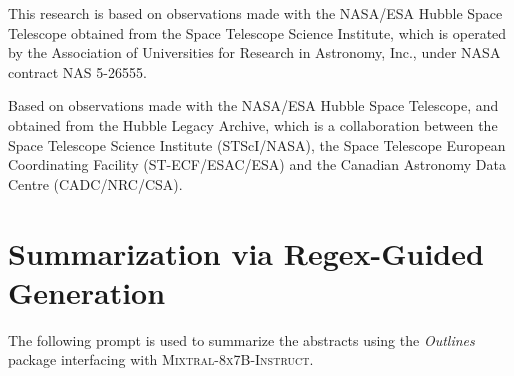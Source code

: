 \documentclass[10pt]{article} %
\newcommand{\package}[1]{\textsl{#1}\xspace}
\begin{document}
This research is based on observations made with the NASA/ESA Hubble Space Telescope obtained from the Space Telescope Science Institute, which is operated by the Association of Universities for Research in Astronomy, Inc., under NASA contract NAS 5-26555.

Based on observations made with the NASA/ESA Hubble Space Telescope, and obtained from the Hubble Legacy Archive, which is a collaboration between the Space Telescope Science Institute (STScI/NASA), the Space Telescope European Coordinating Facility (ST-ECF/ESAC/ESA) and the Canadian Astronomy Data Centre (CADC/NRC/CSA).





\appendix
\section{Summarization via Regex-Guided Generation}
\label{app:summarization}

The following prompt is used to summarize the abstracts using the \package{Outlines} package interfacing with \textsc{Mixtral-8x7B-Instruct}.
\end{document}

